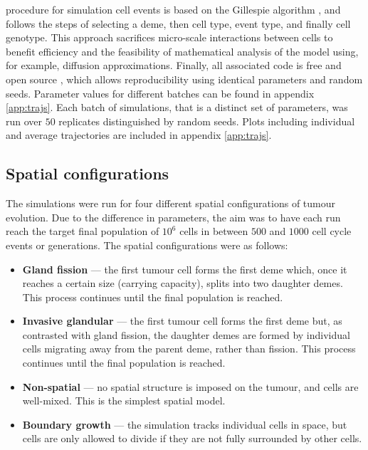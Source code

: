procedure for simulation cell events is based on the Gillespie algorithm
\cite{gillespie_exact_1977}, and follows the steps of selecting a deme, then
cell type, event type, and finally cell genotype. This approach sacrifices
micro-scale interactions between cells to benefit efficiency and the feasibility
of mathematical analysis of the model using, for example, diffusion
approximations. Finally, all associated code is free and open source
\cite{noble_demon_2020, vesmanojlovic_trajectories,
kimverity_kimverityruiindices_2023}, which allows reproducibility using
identical parameters and random seeds. Parameter values for different batches
can be found in appendix \ref{app:trajs}. Each batch of simulations, that is a
distinct set of parameters, was run over $50$ replicates distinguished by
random seeds. Plots including individual and average trajectories are included
in appendix \ref{app:trajs}.

\subsection{Spatial configurations}
The simulations were run for four different spatial configurations of tumour
evolution. Due to the difference in parameters, the aim was to have each run
reach the target final population of $10^6$ cells in between $500$ and $1000$
cell cycle events or generations. The spatial configurations were as follows:
\begin{itemize}
    \item \textbf{Gland fission} --- the first tumour cell forms the first deme
        which, once it reaches a certain size (carrying capacity), splits into
        two daughter demes. This process continues until the final population is
        reached.
    \item \textbf{Invasive glandular} --- the first tumour cell forms the first
        deme but, as contrasted with gland fission, the daughter demes are
        formed by individual cells migrating away from the parent deme, rather
        than fission. This process continues until the final population is
        reached.
    \item \textbf{Non-spatial} --- no spatial structure is imposed on the
        tumour, and cells are well-mixed. This is the simplest spatial model.
    \item \textbf{Boundary growth} --- the simulation tracks individual cells in
        space, but cells are only allowed to divide if they are not fully
        surrounded by other cells.
\end{itemize}

